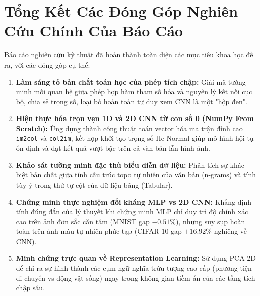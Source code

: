 \documentclass[12pt,a4paper]{report}
\begin{document}
\section{Tổng Kết Các Đóng Góp Nghiên Cứu Chính Của Báo Cáo}
Báo cáo nghiên cứu kỹ thuật đã hoàn thành toàn diện các mục tiêu khoa học đề ra, với các đóng góp cụ thể:
\begin{enumerate}
    \item \textbf{Làm sáng tỏ bản chất toán học của phép tích chập:} Giải mã tường minh mối quan hệ giữa phép hợp hàm tham số hóa và nguyên lý kết nối cục bộ, chia sẻ trọng số, loại bỏ hoàn toàn tư duy xem CNN là một "hộp đen".
    \item \textbf{Hiện thực hóa trọn vẹn 1D và 2D CNN từ con số 0 (NumPy From Scratch):} Ứng dụng thành công thuật toán vector hóa ma trận đỉnh cao \texttt{im2col} và \texttt{col2im}, kết hợp khởi tạo trọng số He Normal giúp mô hình hội tụ ổn định và đạt kết quả vượt bậc trên cả văn bản lẫn hình ảnh.
    \item \textbf{Khảo sát tường minh đặc thù biểu diễn dữ liệu:} Phân tích sự khác biệt bản chất giữa tính cấu trúc topo tự nhiên của văn bản (n-grams) và tính tùy ý trong thứ tự cột của dữ liệu bảng (Tabular).
    \item \textbf{Chứng minh thực nghiệm đối kháng MLP vs 2D CNN:} Khẳng định tính đúng đắn của lý thuyết khi chứng minh MLP chỉ duy trì độ chính xác cao trên ảnh đơn sắc căn tâm (MNIST gap $-0.51\%$), nhưng suy sụp hoàn toàn trên ảnh màu tự nhiên phức tạp (CIFAR-10 gap $+16.92\%$ nghiêng về CNN).
    \item \textbf{Minh chứng trực quan về Representation Learning:} Sử dụng PCA 2D để chỉ ra sự hình thành các cụm ngữ nghĩa trừu tượng cao cấp (phương tiện di chuyển vs động vật sống) ngay trong không gian tiềm ẩn của các tầng tích chập sâu.
\end{enumerate}
\end{document}
